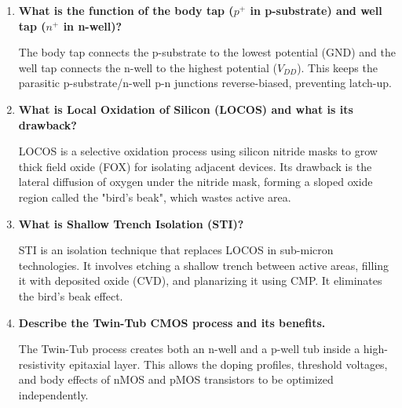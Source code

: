 \documentclass[12pt,a4paper]{article}
\newcommand{\Q}[1]{\textbf{#1}\par\noindent\ignorespaces}
\begin{document}
\begin{tcolorbox}[exambox, title={\textbf{Frequently Asked / Viva Questions}}]
\begin{enumerate}[topsep=0pt, label=\textbf{Q\arabic*.}, itemsep=5pt]
  \item \Q{What is the function of the body tap ($p^+$ in p-substrate) and well tap ($n^+$ in n-well)?}
    The body tap connects the p-substrate to the lowest potential (GND) and the well tap connects the n-well to the highest potential ($V_{DD}$). This keeps the parasitic p-substrate/n-well p-n junctions reverse-biased, preventing latch-up.
  \item \Q{What is Local Oxidation of Silicon (LOCOS) and what is its drawback?}
    LOCOS is a selective oxidation process using silicon nitride masks to grow thick field oxide (FOX) for isolating adjacent devices. Its drawback is the lateral diffusion of oxygen under the nitride mask, forming a sloped oxide region called the "bird's beak", which wastes active area.
  \item \Q{What is Shallow Trench Isolation (STI)?}
    STI is an isolation technique that replaces LOCOS in sub-micron technologies. It involves etching a shallow trench between active areas, filling it with deposited oxide (CVD), and planarizing it using CMP. It eliminates the bird's beak effect.
  \item \Q{Describe the Twin-Tub CMOS process and its benefits.}
    The Twin-Tub process creates both an n-well and a p-well tub inside a high-resistivity epitaxial layer. This allows the doping profiles, threshold voltages, and body effects of nMOS and pMOS transistors to be optimized independently.
\end{enumerate}
\end{tcolorbox}
\end{document}
